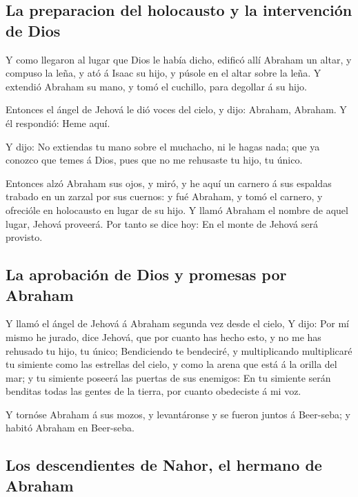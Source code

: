 \hypertarget{la-preparacion-del-holocausto-y-la-intervenciuxf3n-de-dios}{%
\subsection{La preparacion del holocausto y la intervención de
Dios}\label{la-preparacion-del-holocausto-y-la-intervenciuxf3n-de-dios}}

 Y como llegaron al lugar que Dios le había dicho, edificó
allí Abraham un altar, y compuso la leña, y ató á Isaac su hijo, y
púsole en el altar sobre la leña.  Y extendió Abraham su
mano, y tomó el cuchillo, para degollar á su hijo.

 Entonces el ángel de Jehová le dió voces del cielo, y
dijo: Abraham, Abraham. Y él respondió: Heme aquí.

 Y dijo: No extiendas tu mano sobre el muchacho, ni le
hagas nada; que ya conozco que temes á Dios, pues que no me rehusaste tu
hijo, tu único.

 Entonces alzó Abraham sus ojos, y miró, y he aquí un
carnero á sus espaldas trabado en un zarzal por sus cuernos: y fué
Abraham, y tomó el carnero, y ofrecióle en holocausto en lugar de su
hijo.  Y llamó Abraham el nombre de aquel lugar, Jehová
proveerá. Por tanto se dice hoy: En el monte de Jehová será provisto.

\hypertarget{la-aprobaciuxf3n-de-dios-y-promesas-por-abraham}{%
\subsection{La aprobación de Dios y promesas por
Abraham}\label{la-aprobaciuxf3n-de-dios-y-promesas-por-abraham}}

 Y llamó el ángel de Jehová á Abraham segunda vez desde
el cielo,  Y dijo: Por mí mismo he jurado, dice Jehová,
que por cuanto has hecho esto, y no me has rehusado tu hijo, tu único;
 Bendiciendo te bendeciré, y multiplicando multiplicaré
tu simiente como las estrellas del cielo, y como la arena que está á la
orilla del mar; y tu simiente poseerá las puertas de sus enemigos:
 En tu simiente serán benditas todas las gentes de la
tierra, por cuanto obedeciste á mi voz.

 Y tornóse Abraham á sus mozos, y levantáronse y se
fueron juntos á Beer-seba; y habitó Abraham en Beer-seba.

\hypertarget{los-descendientes-de-nahor-el-hermano-de-abraham}{%
\subsection{Los descendientes de Nahor, el hermano de
Abraham}\label{los-descendientes-de-nahor-el-hermano-de-abraham}}

